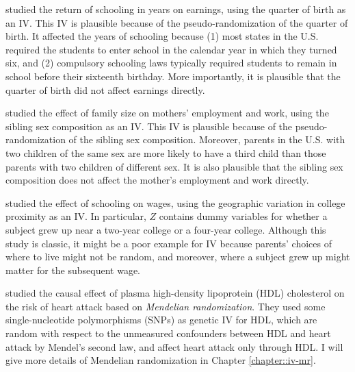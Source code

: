 \begin{example}
\citet{angrist1991does} studied the return of schooling in years on earnings, using the quarter of birth as an IV. This IV is plausible because of the pseudo-randomization of the quarter of birth.  It affected the years of schooling because (1) most states in the U.S. required the students to enter school in the calendar year in which they turned six, and (2) compulsory schooling laws typically required students to remain in school before their sixteenth birthday. More importantly, it is plausible that the quarter of birth did not affect earnings directly. 
\end{example}


\begin{example}
\citet{angrist1998children} studied the effect of family size on mothers' employment and work, using the sibling sex composition as an IV. This IV is plausible because of the pseudo-randomization of the sibling sex composition. Moreover, parents in the U.S. with two children of the same sex are more likely to have a third child than those parents with two children of different sex. It is also plausible that the sibling sex composition does not affect the mother's employment and work directly. 
\end{example}


\begin{example}\label{example::Card1993}
\citet{card1993using} studied the effect of schooling on wages, using the geographic variation in college proximity as an IV. In particular, $Z$ contains dummy variables for whether a subject grew up near a two-year college or a four-year college. Although this study is classic, it might be a poor example for IV because parents' choices of where to live might not be random, and moreover, where a subject grew up might matter for the subsequent wage. 
\end{example}



\begin{example}
\citet{voight2012plasma} studied the causal effect of plasma high-density lipoprotein (HDL) cholesterol on the risk of heart attack based on {\it Mendelian randomization}. They used some single-nucleotide polymorphisms (SNPs) as genetic IV for HDL, which are random with respect to the unmeasured confounders between HDL and heart attack by Mendel's second law, and affect heart attack only through HDL. 
I will give more details of Mendelian randomization in Chapter \ref{chapter::iv-mr}. 
\end{example}



